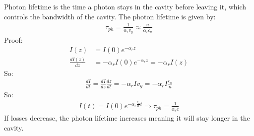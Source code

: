\documentclass[11pt]{article}
\begin{document}
Photon lifetime is the time a photon stays in the cavity before leaving it, which controls the bandwidth of the cavity. The photon lifetime is given by:
\begin{align*}
    \tau_{ph} = \frac{1}{\alpha_r v_g} \approx \frac{n}{\alpha_r c_o} 
\end{align*}
Proof:
\begin{align*}
    I(z) &= I(0) e^{-\alpha_r z} \\
    \frac{dI(z)}{dz} &= -\alpha_r I(0) e^{-\alpha_r z} = -\alpha_r I(z)
\end{align*}
So:
\begin{align*}
    \frac{dI}{dt} = \frac{dI}{dz} \frac{dz}{dt} = -\alpha_r I v_g = -\alpha_r I \frac{c_o}{n}
\end{align*}
So:
\begin{align*}
    I(t) = I(0) e^{-\alpha_r \frac{c_o}{n} t} \Rightarrow \tau_{ph} = \frac{1}{\alpha_r c}
\end{align*}
If losses decrease, the photon lifetime increases meaning it will stay longer in the cavity. 
\end{document}
